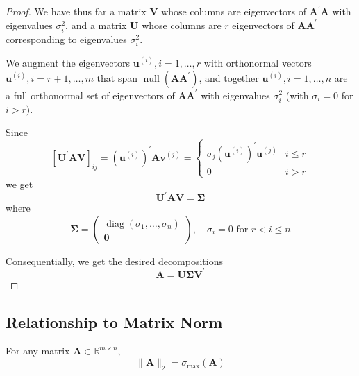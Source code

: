 \begin{proof}
    We have thus far a matrix $\mathbf{V}$ whose columns are eigenvectors of $\mathbf{A}^{\prime}\mathbf{A}$ with eigenvalues $\sigma_{i}^{2}$, and a matrix $\mathbf{U}$ whose columns are $r$ eigenvectors of $\mathbf{A}\mathbf{A}^{\prime}$ corresponding to eigenvalues $\sigma_{i}^{2}$.

    We augment the eigenvectors $\boldsymbol{u}^{(i)},i=1,\ldots,r$ with orthonormal vectors $\boldsymbol{u}^{(i)},i=r+1,\ldots,m$ that span $\operatorname{null}\left(\mathbf{A}\mathbf{A}^{\prime}\right)$, and together $\boldsymbol{u}^{(i)},i=1,\ldots,n$ are a full orthonormal set of eigenvectors of $\mathbf{A}\mathbf{A}^{\prime}$ with eigenvalues $\sigma_{i}^{2}$ (with $\sigma_{i}=0$ for $i>r)$.

    Since
    \begin{equation*}
        \left[\mathbf{U}^{\prime}\mathbf{A}\mathbf{V}\right]_{ij}=\left(\boldsymbol{u}^{(i)}\right)^{\prime}\mathbf{A}\boldsymbol{v}^{(j)}=\begin{cases}\sigma_{j}\left(\boldsymbol{u}^{(i)}\right)^{\prime}\boldsymbol{u}^{(j)} & i \leq r \\ 0 & i>r\end{cases}
    \end{equation*}
    we get
    \begin{equation*}
        \mathbf{U}^{\prime}\mathbf{A}\mathbf{V}=\boldsymbol{\Sigma}
    \end{equation*}
    where
    \begin{equation*}
        \boldsymbol{\Sigma}=\begin{pmatrix}
            \operatorname{diag}\left(\sigma_{1},\ldots,\sigma_{n}\right) \\
            \mathbf{0}
        \end{pmatrix}
        ,\quad\sigma_{i}=0\text { for } r<i\leq n
    \end{equation*}

    Consequentially, we get the desired decompositions
    \begin{equation*}
        \mathbf{A}=\mathbf{U}\boldsymbol{\Sigma}\mathbf{V}^{\prime}
    \end{equation*}
\end{proof}

\subsection{Relationship to Matrix Norm}

\begin{theorem}
    For any matrix $\mathbf{A}\in\mathbb{R}^{m\times n}$,
    \begin{equation}
        \|\mathbf{A}\|_{2}=\sigma_{\max}(\mathbf{A})
    \end{equation}
\end{theorem}

